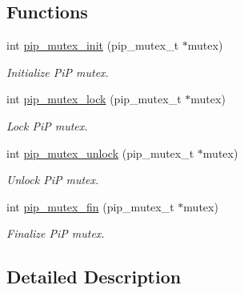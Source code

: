 \documentclass[twoside]{book}
\begin{document}
\subsection*{Functions}
\begin{DoxyCompactItemize}
\item 
int \hyperlink{group__ulp-5-mutex_gaff168395426838d385ad6720c9fb4184}{pip\-\_\-mutex\-\_\-init} (pip\-\_\-mutex\-\_\-t $\ast$mutex)
\begin{DoxyCompactList}\small\item\em Initialize Pi\-P mutex. \end{DoxyCompactList}\item 
int \hyperlink{group__ulp-5-mutex_ga14f77d2413590f58d7a45a3b56960c90}{pip\-\_\-mutex\-\_\-lock} (pip\-\_\-mutex\-\_\-t $\ast$mutex)
\begin{DoxyCompactList}\small\item\em Lock Pi\-P mutex. \end{DoxyCompactList}\item 
int \hyperlink{group__ulp-5-mutex_ga370bb79d84360fdb96169fc5cea789ee}{pip\-\_\-mutex\-\_\-unlock} (pip\-\_\-mutex\-\_\-t $\ast$mutex)
\begin{DoxyCompactList}\small\item\em Unlock Pi\-P mutex. \end{DoxyCompactList}\item 
int \hyperlink{group__ulp-5-mutex_ga884fae0413bd07dbdb5f3940129b7b20}{pip\-\_\-mutex\-\_\-fin} (pip\-\_\-mutex\-\_\-t $\ast$mutex)
\begin{DoxyCompactList}\small\item\em Finalize Pi\-P mutex. \end{DoxyCompactList}\end{DoxyCompactItemize}


\subsection{Detailed Description}
\end{document}
